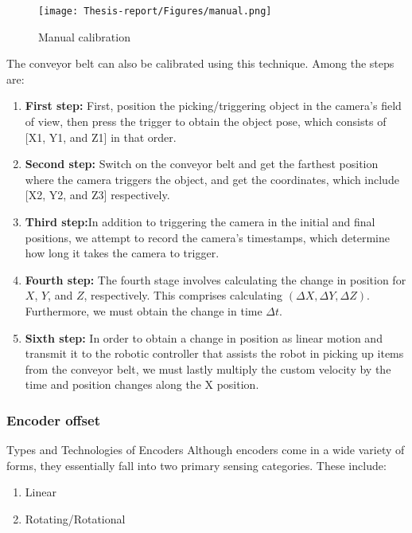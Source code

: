 \documentclass[12pt]{article}
\begin{document}
\begin{figure}[h]
    \centering
    \texttt{[image: Thesis-report/Figures/manual.png]} 
    \caption{Manual calibration \cite{ref2} }
    \label{fig1.Photoneo Cmaera}
\end{figure}


The conveyor belt can also be calibrated using this technique.  Among the steps are:
\begin{enumerate}
    \item \textbf{First step:}  First, position the picking/triggering object in the camera's field of view, then press the trigger to obtain the object pose, which consists of [X1, Y1, and Z1] in that order\cite{ref2}.
    \item \textbf{Second step:} Switch on the conveyor belt and get the farthest position where the camera triggers the object, and get the coordinates, which include [X2, Y2, and Z3] respectively\cite{ref2}.
    \item \textbf{Third step:}In addition to triggering the camera in the initial and final positions, we attempt to record the camera's timestamps, which determine how long it takes the camera to trigger\cite{ref2}.
    \item \textbf{Fourth step:} The fourth stage involves calculating the change in position for \(X\), \(Y\), and \(Z\), respectively. This comprises calculating \((\Delta X, \Delta Y, \Delta Z)\). Furthermore, we must obtain the change in time \(\Delta t\)\cite{ref2}.
    \item \textbf{Sixth step:} In order to obtain a change in position as linear motion and transmit it to the robotic controller that assists the robot in picking up items from the conveyor belt, we must lastly multiply the custom velocity by the time and position changes along the X position\cite{ref2}.
\end{enumerate}



\subsubsection{Encoder offset}
Types and Technologies of Encoders
Although encoders come in a wide variety of forms, they essentially fall into two primary sensing categories. These include:

\begin{enumerate}
    \item  Linear
    \item Rotating/Rotational
    
\end{enumerate}
\end{document}
